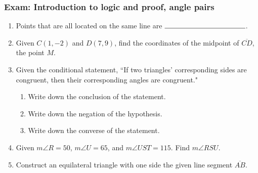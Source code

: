 \documentclass[12pt, oneside]{article}
\begin{document}
\subsubsection*{Exam: Introduction to logic and proof, angle pairs}
  \vspace{0.5cm}
  \begin{enumerate}

  \item Points that are all located on the same line are $\rule{4cm}{0.15mm}$. \bigskip

  \item Given $C(1,-2)$ and $D(7,9)$, find the coordinates of the midpoint of $\overline{CD}$, the point $M$.
    \vspace{4cm}

  \item Given the conditional statement, ``If two triangles' corresponding sides are congruent, then their corresponding angles are congruent."
    \begin{enumerate}
      \item Write down the conclusion of the statement. \vspace{1.5cm}
      \item Write down the negation of the hypothesis. \vspace{1.5cm}
      \item Write down the converse of the statement. \vspace{2.5cm}
    \end{enumerate}

  \item Given $m\angle R=50$, $m\angle U =65$, and $m\angle UST=115$. Find $m\angle RSU$.\\[1cm]
    \vspace{3cm}

\newpage
  \item Construct an equilateral triangle with one side the given line segment $\overline{AB}$.\\
    \vspace{5cm}
    \begin{center}
    \end{center}
    \vspace{2cm}


\end{enumerate}
\end{document}
